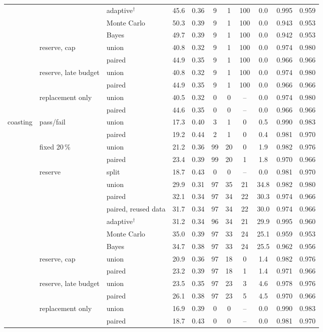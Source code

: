 \begin{table}[htbp]
\begin{tabular*}{\textwidth}{@{\extracolsep{\fill}}lllcccccccc@{}}
 &  & adaptive$^{\dagger}$ & 45.6 & 0.36 & 9 & 1 & 100 & 0.0 & 0.995 & 0.959 \\
 &  & Monte Carlo & 50.3 & 0.39 & 9 & 1 & 100 & 0.0 & 0.943 & 0.953 \\
 &  & Bayes & 49.7 & 0.39 & 9 & 1 & 100 & 0.0 & 0.942 & 0.953 \\
 & reserve, cap & union & 40.8 & 0.32 & 9 & 1 & 100 & 0.0 & 0.974 & 0.980 \\
 &  & paired & 44.9 & 0.35 & 9 & 1 & 100 & 0.0 & 0.966 & 0.966 \\
 & reserve, late budget & union & 40.8 & 0.32 & 9 & 1 & 100 & 0.0 & 0.974 & 0.980 \\
 &  & paired & 44.9 & 0.35 & 9 & 1 & 100 & 0.0 & 0.966 & 0.966 \\
 & replacement only & union & 40.5 & 0.32 & 0 & 0 & -- & 0.0 & 0.974 & 0.980 \\
 &  & paired & 44.6 & 0.35 & 0 & 0 & -- & 0.0 & 0.966 & 0.966 \\
\addlinespace
coasting & pass/fail & union & 17.3 & 0.40 & 3 & 1 & 0 & 0.5 & 0.990 & 0.983 \\
 &  & paired & 19.2 & 0.44 & 2 & 1 & 0 & 0.4 & 0.981 & 0.970 \\
 & fixed 20\,\% & union & 21.2 & 0.36 & 99 & 20 & 0 & 1.9 & 0.982 & 0.976 \\
 &  & paired & 23.4 & 0.39 & 99 & 20 & 1 & 1.8 & 0.970 & 0.966 \\
 & reserve & split & 18.7 & 0.43 & 0 & 0 & -- & 0.0 & 0.981 & 0.970 \\
 &  & union & 29.9 & 0.31 & 97 & 35 & 21 & 34.8 & 0.982 & 0.980 \\
 &  & paired & 32.1 & 0.34 & 97 & 34 & 22 & 30.3 & 0.974 & 0.966 \\
 &  & paired, reused data & 31.7 & 0.34 & 97 & 34 & 22 & 30.0 & 0.974 & 0.966 \\
 &  & adaptive$^{\dagger}$ & 31.2 & 0.34 & 96 & 34 & 21 & 29.9 & 0.995 & 0.960 \\
 &  & Monte Carlo & 35.0 & 0.39 & 97 & 33 & 24 & 25.1 & 0.959 & 0.953 \\
 &  & Bayes & 34.7 & 0.38 & 97 & 33 & 24 & 25.5 & 0.962 & 0.956 \\
 & reserve, cap & union & 20.9 & 0.36 & 97 & 18 & 0 & 1.4 & 0.982 & 0.976 \\
 &  & paired & 23.2 & 0.39 & 97 & 18 & 1 & 1.4 & 0.971 & 0.966 \\
 & reserve, late budget & union & 23.5 & 0.35 & 97 & 23 & 3 & 4.6 & 0.978 & 0.976 \\
 &  & paired & 26.1 & 0.38 & 97 & 23 & 5 & 4.5 & 0.970 & 0.966 \\
 & replacement only & union & 16.9 & 0.39 & 0 & 0 & -- & 0.0 & 0.990 & 0.983 \\
 &  & paired & 18.7 & 0.43 & 0 & 0 & -- & 0.0 & 0.981 & 0.970 \\
\bottomrule
\end{tabular*}
\end{table}
